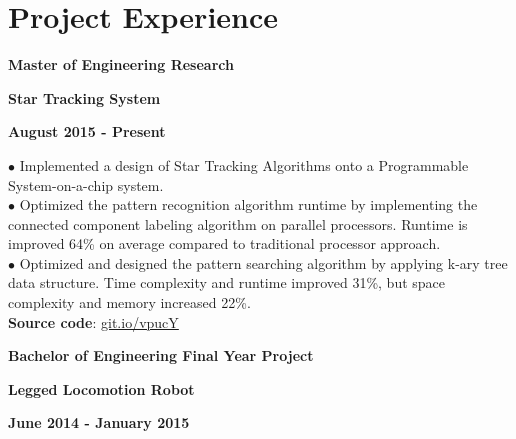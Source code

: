 \documentclass[10pt]{article}
\begin{document}
    \section{Project Experience}

        \vspace{-5mm}

        \begin{multicols}{3}
            \begin{flushleft}
                \textbf{Master of Engineering Research}
            \end{flushleft}

            \columnbreak

            \begin{center}
                \textbf{Star Tracking System}
            \end{center}

            \columnbreak

            \begin{flushright}
                \textbf{August 2015 - Present}
            \end{flushright}
        \end{multicols}

        \vspace{-5mm}

        $\bullet$ {Implemented a design of Star Tracking Algorithms onto a Programmable System-on-a-chip system. }\\
        $\bullet$ {Optimized the pattern recognition algorithm runtime by implementing the connected component labeling algorithm on parallel processors. Runtime is improved 64\% on average compared to traditional processor approach.} \\
        $\bullet$ {Optimized and designed the pattern searching algorithm by applying k-ary tree data structure. Time complexity and runtime improved 31\%, but space complexity and memory increased 22\%.} \\
        \textbf{Source code}: \href{https://git.io/vpucY}{git.io/vpucY}


        \begin{multicols}{3}
            \begin{flushleft}
                \textbf{Bachelor of Engineering Final Year Project}
            \end{flushleft}

            \columnbreak

            \begin{center}
                \textbf{Legged Locomotion Robot}
            \end{center}

            \columnbreak

            \begin{flushright}
                \textbf{June 2014 - January 2015}
            \end{flushright}
        \end{multicols}
\end{document}
